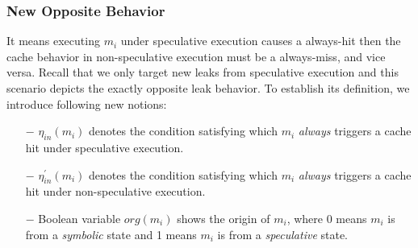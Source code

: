 \documentclass[sigconf]{acmart}
\begin{document}
\subsubsection{New Opposite Behavior}
\label{sec:new_opp}
It means executing $\mathit{m_i}$ under speculative execution causes a 
always-hit then the cache behavior in non-speculative execution must be
a always-miss, and vice versa. Recall that we only target new leaks from 
speculative execution and this scenario depicts the exactly opposite leak
behavior. To establish its definition, we introduce following new notions: 

%
\begin{itemize}
  \item [$-$]$\mathit{\eta_{in}(m_i)}$ denotes the condition satisfying which 
    $\mathit{m_i}$ \textit{always} triggers a cache hit under speculative 
	execution.
  \item [$-$]$\mathit{\eta^\prime_{in}(m_i)}$ denotes the condition satisfying which 
    $\mathit{m_i}$ \textit{always} triggers a cache hit under non-speculative
	execution.
  \item [$-$]Boolean variable $\mathit{org(m_i)}$ shows the origin of $\mathit{m_i}$, 
    where 0 means $\mathit{m_i}$ is from a \textit{symbolic} state and 1 means 
    $\mathit{m_i}$ is from a \textit{speculative} state.
\end{itemize}
%
\end{document}
